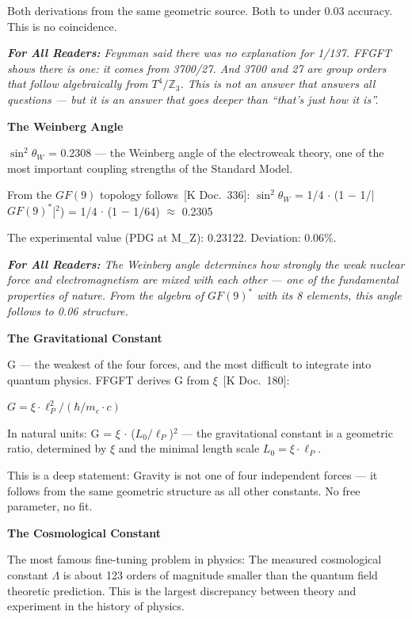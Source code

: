 \documentclass[11pt,oneside]{book}
\newcommand{\status}[1]{\penalty10000\,{\scriptsize\textcolor{gray!60}{[#1]}}}
\newenvironment{laierspur}{%
  \par\vspace{4pt}%
  \noindent\small\itshape\color{blue!60!black}%
  \textbf{For All Readers:}\enspace\ignorespaces}{%
  \par\vspace{4pt}\normalsize\normalfont\normalcolor}
\begin{document}
Both derivations from the same geometric source. Both to under 0.03%
accuracy. This is no coincidence.

\begin{laierspur}
Feynman said there was no explanation for 1/137. FFGFT shows there is one: it comes from
3700/27. And 3700 and 27 are group orders that follow algebraically from
$T^4/\mathbb{Z}_3$. This is not an answer that answers all questions — but it is an
answer that goes deeper than \enquote{that's just how it is}.
\end{laierspur}

\textbf{The Weinberg Angle}

$\sin^2\theta_W$ = 0.2308 — the Weinberg angle of the electroweak theory,
one of the most important coupling strengths of the Standard Model.

From the $GF(9)$ topology follows \status{K Doc.~336}:
$\sin^2\theta_W$ = 1/4 $\cdot$ (1 $-$ 1/|$GF(9)^*$|$^2$) = 1/4 $\cdot$ (1 $-$ 1/64) $\approx$ 0.2305

The experimental value (PDG at M\_Z): 0.23122. Deviation: 0.06\%.

\begin{laierspur}
The Weinberg angle determines how strongly the weak nuclear force and
electromagnetism are mixed with each other — one of the fundamental
properties of nature. From the algebra of $GF(9)^*$ with its 8 elements, this
angle follows to 0.06%
structure.
\end{laierspur}

\textbf{The Gravitational Constant}

G — the weakest of the four forces, and the most difficult to integrate into
quantum physics. FFGFT derives G from $\xi$ \status{K Doc.~180}:

$G = \xi \cdot \ell_P^{2} / (\hbar / m_e \cdot c)$

In natural units: G = $\xi$ $\cdot$ ($L_0/\ell_P$)$^2$ — the gravitational constant
is a geometric ratio, determined by $\xi$ and the minimal length scale
$L_0 = \xi \cdot \ell_P$.

This is a deep statement: Gravity is not one of four independent forces —
it follows from the same geometric structure as all other constants. No free
parameter, no fit.

\textbf{The Cosmological Constant}

The most famous fine-tuning problem in physics: The measured cosmological
constant $\Lambda$ is about 123 orders of magnitude smaller than the quantum
field theoretic prediction. This is the largest discrepancy between theory
and experiment in the history of physics.
\end{document}
